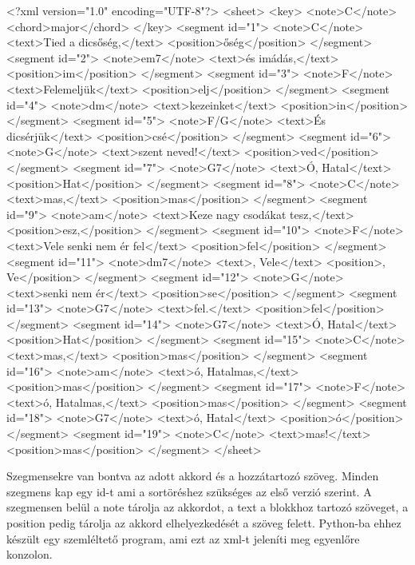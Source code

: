 \begin{xml}
<?xml version="1.0" encoding="UTF-8"?>
<sheet>
   <key>
      <note>C</note>
      <chord>major</chord>
   </key>
   <segment id="1">
      <note>C</note>
      <text>Tied a dicsőség,</text>
      <position>őség</position>
   </segment>
   <segment id="2">
      <note>em7</note>
      <text>és imádás,\n</text>
      <position>im</position>
   </segment>
   <segment id="3">
      <note>F</note>
      <text>Felemeljük</text>
      <position>elj</position>
   </segment>
   <segment id="4">
      <note>dm</note>
      <text>kezeinket\n</text>
      <position>in</position>
   </segment>
   <segment id="5">
      <note>F/G</note>
      <text>És dicsérjük</text>
      <position>csé</position>
   </segment>
   <segment id="6">
      <note>G</note>
      <text>szent neved!\n</text>
      <position>ved</position>
   </segment>
   <segment id="7">
      <note>G7</note>
      <text>Ó, Hatal</text>
      <position>Hat</position>
   </segment>
   <segment id="8">
      <note>C</note>
      <text>mas,</text>
      <position>mas</position>
   </segment>
   <segment id="9">
      <note>am</note>
      <text>Keze nagy csodákat tesz,\n</text>
      <position>esz,</position>
   </segment>
   <segment id="10">
      <note>F</note>
      <text>Vele senki nem ér fel</text>
      <position>fel</position>
   </segment>
   <segment id="11">
      <note>dm7</note>
      <text>, Vele</text>
      <position>, Ve</position>
   </segment>
   <segment id="12">
      <note>G</note>
      <text>senki nem ér</text>
      <position>se</position>
   </segment>
   <segment id="13">
      <note>G7</note>
      <text>fel.\n</text>
      <position>fel</position>
   </segment>
   <segment id="14">
      <note>G7</note>
      <text>Ó, Hatal</text>
      <position>Hat</position>
   </segment>
   <segment id="15">
      <note>C</note>
      <text>mas,</text>
      <position>mas</position>
   </segment>
   <segment id="16">
      <note>am</note>
      <text>ó, Hatalmas,</text>
      <position>mas</position>
   </segment>
   <segment id="17">
      <note>F</note>
      <text>ó, Hatalmas,</text>
      <position>mas</position>
   </segment>
   <segment id="18">
      <note>G7</note>
      <text>ó, Hatal</text>
      <position>ó</position>
   </segment>
   <segment id="19">
      <note>C</note>
      <text>mas!</text>
      <position>mas</position>
   </segment>
</sheet>
\end{xml}

Szegmensekre van bontva az adott akkord és a hozzátartozó szöveg. Minden szegmens kap egy id-t ami a sortöréshez szükséges az első verzió szerint. A szegmensen belül a note tárolja az akkordot, a text a blokkhoz tartozó szöveget, a position pedig tárolja az akkord elhelyezkedését a szöveg felett. Python-ba ehhez készült egy szemléltető program, ami ezt az xml-t jeleníti meg egyenlőre konzolon.

